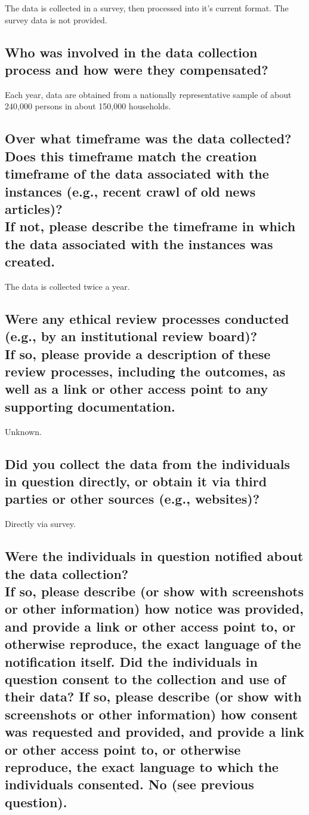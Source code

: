 \documentclass[letterpaper, 10 pt, conference]{ieeeconf}  %
\newcommand{\subtitle}[1]{{\\ \small \normalfont \color{purple} #1}}
\begin{document}
The data is collected in a survey, then processed into it's current format. The survey data is not provided.

\subsection{Who was involved in the data collection process and how were they compensated?}

Each year, data are obtained from a nationally representative sample of about 240,000 persons in about 150,000 households. 

\subsection{Over what timeframe was the data collected? Does this timeframe match the creation timeframe of the data associated with the instances (e.g., recent crawl of old news articles)? \subtitle{If not, please describe the timeframe in which the data associated with the instances was created.}}

The data is collected twice a year.

\subsection{Were any ethical review processes conducted (e.g., by an institutional review board)? \subtitle{If so, please provide a description of these review processes, including the outcomes, as well as a link or other access point to any supporting documentation.}}

Unknown.

\subsection{Did you collect the data from the individuals in question directly, or obtain it via third parties or other sources (e.g., websites)?}

Directly via survey.

\subsection{Were the individuals in question notified about the data collection? \subtitle{If so, please describe (or show with screenshots or other information) how notice was provided, and provide a link or other access point to, or otherwise reproduce, the exact language of the notification itself. Did the individuals in question consent to the collection and use of their data? If so, please describe (or show with screenshots or other information) how consent was requested and provided, and provide a link or other access point to, or otherwise reproduce, the exact language to which the individuals consented. No (see previous question).}}
\end{document}
